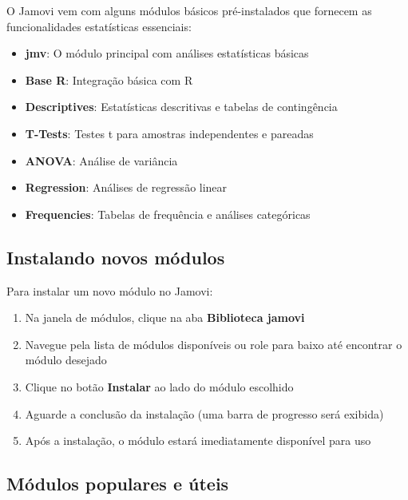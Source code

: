 O Jamovi vem com alguns módulos básicos pré-instalados que fornecem as funcionalidades estatísticas essenciais:

\begin{itemize}
    \item \textbf{jmv}: O módulo principal com análises estatísticas básicas
    \item \textbf{Base R}: Integração básica com R
    \item \textbf{Descriptives}: Estatísticas descritivas e tabelas de contingência
    \item \textbf{T-Tests}: Testes t para amostras independentes e pareadas
    \item \textbf{ANOVA}: Análise de variância
    \item \textbf{Regression}: Análises de regressão linear
    \item \textbf{Frequencies}: Tabelas de frequência e análises categóricas
\end{itemize}

\subsection{Instalando novos módulos}

Para instalar um novo módulo no Jamovi:

\begin{enumerate}
    \item Na janela de módulos, clique na aba \textbf{Biblioteca jamovi}
    \item Navegue pela lista de módulos disponíveis ou role para baixo até encontrar o módulo desejado
    \item Clique no botão \textbf{Instalar} ao lado do módulo escolhido
    \item Aguarde a conclusão da instalação (uma barra de progresso será exibida)
    \item Após a instalação, o módulo estará imediatamente disponível para uso
\end{enumerate}


\subsection{Módulos populares e úteis}

